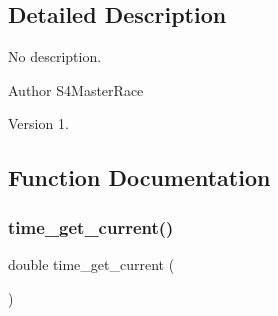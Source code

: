 \subsection{Detailed Description}
No description. 

\begin{DoxyAuthor}{Author}
S4\+Master\+Race 
\end{DoxyAuthor}
\begin{DoxyVersion}{Version}
1. 
\end{DoxyVersion}


\subsection{Function Documentation}
\mbox{\label{timing_8h_a899d3b327b932a5d17c71bb5613e5f33}} 
\subsubsection{time\+\_\+get\+\_\+current()}
{\footnotesize\ttfamily double time\+\_\+get\+\_\+current (\begin{DoxyParamCaption}{ }\end{DoxyParamCaption})\hspace{0.3cm}{\ttfamily [inline]}}

